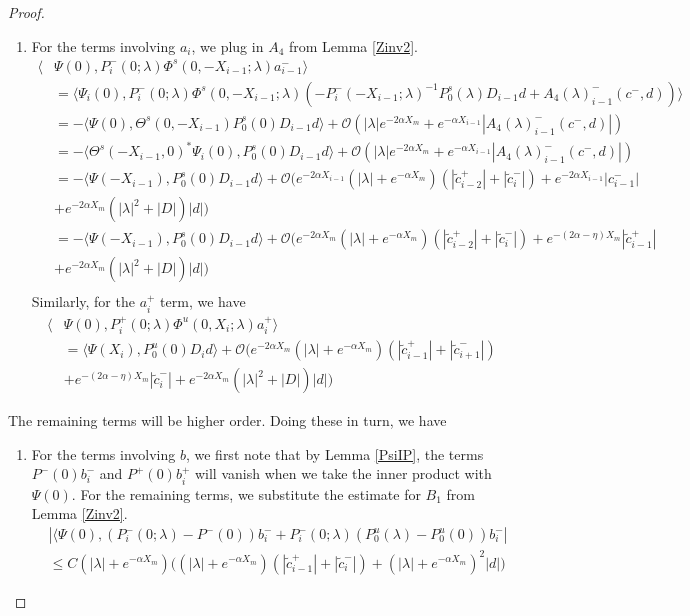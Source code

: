 \documentclass[thesis.tex]{subfiles}
\begin{document}
\begin{lemma}
\begin{proof}
\begin{enumerate}
\item For the terms involving $a_i$, we plug in $A_4$ from Lemma \ref{Zinv2}.
\begin{align*}
\langle &\Psi(0), P_i^-(0; \lambda) \Phi^s(0, -X_{i-1}; \lambda) a_{i-1}^- \rangle \\
&= \langle \Psi_i(0), P_i^-(0; \lambda) \Phi^s(0, -X_{i-1}; \lambda) (- P_i^-(-X_{i-1}; \lambda)^{-1} P_0^s(\lambda) D_{i-1} d + A_4(\lambda)_{i-1}^-(c^-, d)) \rangle \\
&= -\langle \Psi(0), \Theta^s(0, -X_{i-1}) P_0^s(0) D_{i-1} d \rangle + \mathcal{O}( |\lambda|e^{-2 \alpha X_m} + e^{-\alpha X_{i-1}} |A_4(\lambda)_{i-1}^-(c^-, d)|)\\
&= -\langle \Theta^s(-X_{i-1}, 0)^* \Psi_i(0), P_0^s(0) D_{i-1} d \rangle + \mathcal{O}( |\lambda|e^{-2 \alpha X_m} + e^{-\alpha X_{i-1}} |A_4(\lambda)_{i-1}^-(c^-, d)|)\\
&= -\langle \Psi(-X_{i-1}), P_0^s(0) D_{i-1} d \rangle + \mathcal{O}\Big(  
e^{-2\alpha X_{i-1}} (|\lambda| + e^{-\alpha X_m})(|\tilde{c}_{i-2}^+| + |\tilde{c}_i^-|) + e^{-2\alpha X_{i-1}} |c_{i-1}^-| \\
&+ e^{-2 \alpha X_m}(|\lambda|^2 + |D|)|d| \Big) \\
&= -\langle \Psi(-X_{i-1}), P_0^s(0) D_{i-1} d \rangle 
+ \mathcal{O}\Big(  
e^{-2\alpha X_m} (|\lambda| + e^{-\alpha X_m})(|\tilde{c}_{i-2}^+| + |\tilde{c}_i^-|) + e^{-(2\alpha-\eta) X_m} |\tilde{c}_{i-1}^+| \\
&+ e^{-2 \alpha X_m}(|\lambda|^2 + |D|)|d| \Big) \\
\end{align*}
Similarly, for the $a_i^+$ term, we have
\begin{align*}
\langle &\Psi(0), P_i^+(0; \lambda) \Phi^u(0, X_i; \lambda) a_i^+ \rangle \\
&= \langle \Psi(X_i), P_0^u(0) D_i d \rangle + \mathcal{O}\Big( e^{-2 \alpha X_m} (|\lambda| + e^{-\alpha X_m})(|\tilde{c}_{i-1}^+| + |\tilde{c}_{i+1}^-|) \\
&+ e^{-(2 \alpha - \eta) X_m} |\tilde{c}_i^-| + e^{-2 \alpha X_m}(|\lambda|^2 + |D|)|d| \Big)
\end{align*}

\end{enumerate}

The remaining terms will be higher order. Doing these in turn, we have

\begin{enumerate}
\item For the terms involving $b$, we first note that by Lemma \ref{PsiIP}, the terms $P^-(0) b_i^-$ and $P^+(0)b_i^+$ will vanish when we take the inner product with $\Psi(0)$. For the remaining terms, we substitute the estimate for $B_1$ from Lemma \ref{Zinv2}.
\begin{align*}
&|\langle \Psi(0), (P_i^-(0; \lambda) - P^-(0))b_i^- + P_i^-(0; \lambda)(P_0^u(\lambda) - P_0^u(0))b_i^-| \\
&\leq C (|\lambda| + e^{-\alpha X_m})\Big( 
(|\lambda| + e^{-\alpha X_m})( |\tilde{c}_{i-1}^+| + |\tilde{c}_i^-|)+ (|\lambda| + e^{-\alpha X_m})^2|d| \Big)
\end{align*}


\end{enumerate}
\end{proof}
\end{lemma}
\end{document}
